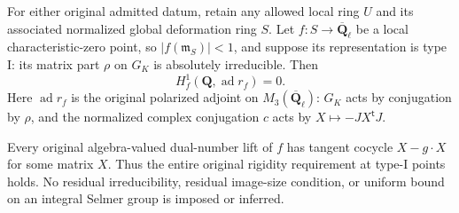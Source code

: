 \begin{theorem}
\label{thm:support-type-one-rigidity}
For either original admitted datum, retain any allowed local ring
$U$ and its associated normalized global deformation ring $S$.
Let $f:S\to\overline{\mathbf Q}_\ell$ be a local characteristic-zero
point, so $|f(\mathfrak m_S)|<1$, and suppose its representation is
type I: its matrix part $\rho$ on $G_K$ is absolutely irreducible.
Then
\[
                 H_f^1(\mathbf Q,\operatorname{ad}r_f)=0.         \tag{TR3}
\]
Here $\operatorname{ad}r_f$ is the original polarized adjoint on
$M_3(\overline{\mathbf Q}_\ell)$: $G_K$ acts by conjugation by
$\rho$, and the normalized complex conjugation $c$ acts by
$X\mapsto-JX^{\mathsf t}J$.

Every original algebra-valued dual-number lift of $f$ has tangent
cocycle $X-g\cdot X$ for some matrix $X$.  Thus the entire original
rigidity requirement at type-I points holds.  No residual
irreducibility, residual image-size condition, or uniform bound on an
integral Selmer group is imposed or inferred.
\end{theorem}

